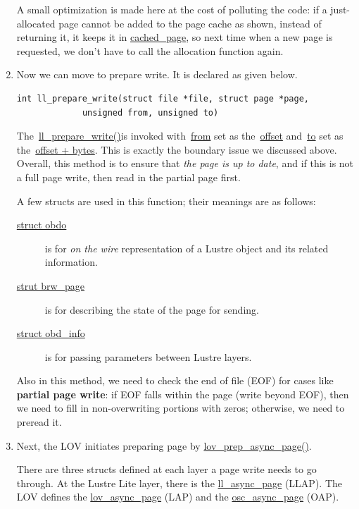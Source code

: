 \begin{enumerate}
A small optimization is made here at the cost of polluting the code: if a
just-allocated page cannot be added to the page cache as shown, instead of
returning it, it keeps it in \url{cached_page}, so next time when a new page is
requested, we don't have to call the allocation function again.



\item Now we can move to prepare write. It is declared as given below.

\begin{Verbatim}
int ll_prepare_write(struct file *file, struct page *page, 
		     unsigned from, unsigned to)
\end{Verbatim}

The~\url{ll_prepare_write()}is invoked with~\url{from} set as the~\url{offset}
and~\url{to} set as the~\url{offset + bytes}. This is exactly the boundary
issue we discussed above.  Overall, this method is to
ensure that \textit{the page is up to date}, and if this is not a full page write,
then read in the partial page first. 

A few structs are used in this function; their meanings are as follows:

\begin{description}

\item[\url{struct obdo}] is for \textit{on the wire} representation of a Lustre
object and its related information.

\item[\url{strut brw_page}] is for describing the state of the page for
sending.

\item[\url{struct obd_info}] is for passing parameters between Lustre layers.

\end{description}

Also in this method, we need to check the end of file (EOF) for cases like
\textbf{partial page write}: if EOF falls within the page (write beyond EOF),
then we need to fill in non-overwriting portions with zeros; otherwise, we need
to preread it.

\item Next, the LOV initiates preparing page by \url{lov_prep_async_page()}.

There are three structs defined at each layer a page write needs to go through.
At the Lustre Lite layer, there is the \url{ll_async_page} (LLAP).  The LOV
defines the \url{lov_async_page} (LAP) and the \url{osc_async_page} (OAP).


\end{enumerate}
